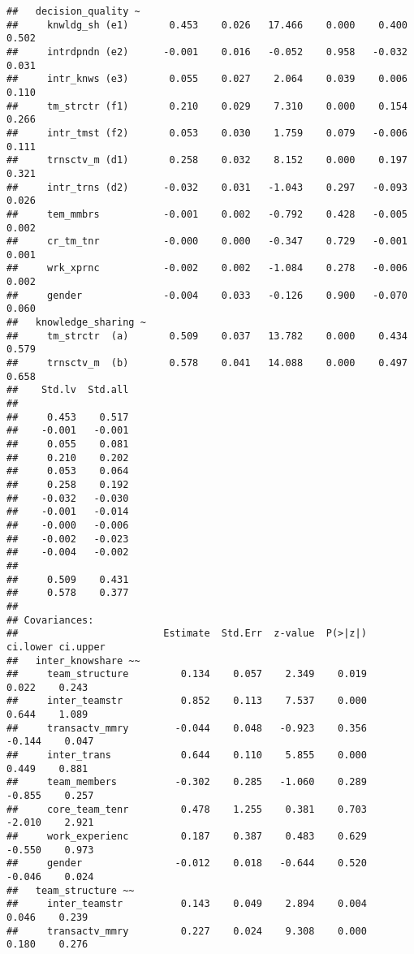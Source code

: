 \documentclass[]{article}
\begin{document}
\begin{verbatim}
##   decision_quality ~                                                       
##     knwldg_sh (e1)       0.453    0.026   17.466    0.000    0.400    0.502
##     intrdpndn (e2)      -0.001    0.016   -0.052    0.958   -0.032    0.031
##     intr_knws (e3)       0.055    0.027    2.064    0.039    0.006    0.110
##     tm_strctr (f1)       0.210    0.029    7.310    0.000    0.154    0.266
##     intr_tmst (f2)       0.053    0.030    1.759    0.079   -0.006    0.111
##     trnsctv_m (d1)       0.258    0.032    8.152    0.000    0.197    0.321
##     intr_trns (d2)      -0.032    0.031   -1.043    0.297   -0.093    0.026
##     tem_mmbrs           -0.001    0.002   -0.792    0.428   -0.005    0.002
##     cr_tm_tnr           -0.000    0.000   -0.347    0.729   -0.001    0.001
##     wrk_xprnc           -0.002    0.002   -1.084    0.278   -0.006    0.002
##     gender              -0.004    0.033   -0.126    0.900   -0.070    0.060
##   knowledge_sharing ~                                                      
##     tm_strctr  (a)       0.509    0.037   13.782    0.000    0.434    0.579
##     trnsctv_m  (b)       0.578    0.041   14.088    0.000    0.497    0.658
##    Std.lv  Std.all
##                   
##     0.453    0.517
##    -0.001   -0.001
##     0.055    0.081
##     0.210    0.202
##     0.053    0.064
##     0.258    0.192
##    -0.032   -0.030
##    -0.001   -0.014
##    -0.000   -0.006
##    -0.002   -0.023
##    -0.004   -0.002
##                   
##     0.509    0.431
##     0.578    0.377
## 
## Covariances:
##                         Estimate  Std.Err  z-value  P(>|z|) ci.lower ci.upper
##   inter_knowshare ~~                                                         
##     team_structure         0.134    0.057    2.349    0.019    0.022    0.243
##     inter_teamstr          0.852    0.113    7.537    0.000    0.644    1.089
##     transactv_mmry        -0.044    0.048   -0.923    0.356   -0.144    0.047
##     inter_trans            0.644    0.110    5.855    0.000    0.449    0.881
##     team_members          -0.302    0.285   -1.060    0.289   -0.855    0.257
##     core_team_tenr         0.478    1.255    0.381    0.703   -2.010    2.921
##     work_experienc         0.187    0.387    0.483    0.629   -0.550    0.973
##     gender                -0.012    0.018   -0.644    0.520   -0.046    0.024
##   team_structure ~~                                                          
##     inter_teamstr          0.143    0.049    2.894    0.004    0.046    0.239
##     transactv_mmry         0.227    0.024    9.308    0.000    0.180    0.276

\end{verbatim}
\end{document}
